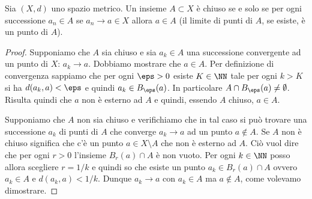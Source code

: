 \begin{theorem}%
  \label{th:chiuso_sequenziale}%
Sia $(X,d)$ uno spazio metrico.
Un insieme $A\subset X$ è chiuso se e solo se
per ogni successione $a_n\in A$ se $a_n\to a\in X$ allora $a \in A$
(il limite di punti di $A$, se esiste, è un punto di $A$).
\end{theorem}
%
\begin{proof}
Supponiamo che $A$ sia chiuso e sia
$a_k \in A$ una successione convergente ad un punto di $X$: $a_k \to a$.
Dobbiamo mostrare che $a\in A$.
Per definizione di convergenza
sappiamo che per ogni $\eps>0$ esiste $K\in \NN$ tale per ogni $k> K$
si ha $d(a_k,a)<\eps$ e quindi $a_k \in B_\eps(a)$.
In particolare $A \cap B_\eps(a) \neq \emptyset$.
Risulta quindi che $a$ non è esterno ad $A$ e quindi, essendo $A$ chiuso, $a\in A$.

Supponiamo che $A$ non sia chiuso e verifichiamo che in tal caso
si può trovare una successione $a_k$ di punti di $A$ che converge $a_k\to a$
ad un punto $a\not\in A$.
Se $A$ non è chiuso significa che c'è un punto $a \in X\setminus A$ che non è esterno ad $A$.
Ciò vuol dire che per ogni $r>0$ l'insieme $B_r(a)\cap A$ è non vuoto. Per ogni $k\in \NN$ posso allora
scegliere $r=1/k$ e quindi so che esiste un punto $a_k\in B_r(a) \cap A$ ovvero $a_k \in A$ e
$d(a_k,a) < 1/k$.
Dunque $a_k \to a$ con $a_k\in A$ ma $a\not \in A$, come volevamo dimostrare.
\end{proof}

